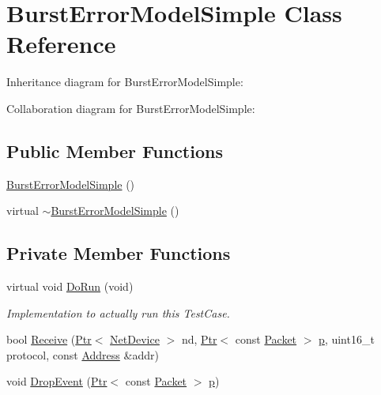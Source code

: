 \hypertarget{classBurstErrorModelSimple}{}\section{Burst\+Error\+Model\+Simple Class Reference}
\label{classBurstErrorModelSimple}


Inheritance diagram for Burst\+Error\+Model\+Simple\+:


Collaboration diagram for Burst\+Error\+Model\+Simple\+:
\subsection*{Public Member Functions}
\begin{DoxyCompactItemize}
\item 
\hyperlink{classBurstErrorModelSimple_ac223ceb1d31443236c2499829157fdf6}{Burst\+Error\+Model\+Simple} ()
\item 
virtual \hyperlink{classBurstErrorModelSimple_afc5f6a826bfa6bf8c0f58dd8e2b8906c}{$\sim$\+Burst\+Error\+Model\+Simple} ()
\end{DoxyCompactItemize}
\subsection*{Private Member Functions}
\begin{DoxyCompactItemize}
\item 
virtual void \hyperlink{classBurstErrorModelSimple_a9db92cbfd5b55bd457a776aaf418de37}{Do\+Run} (void)
\begin{DoxyCompactList}\small\item\em Implementation to actually run this Test\+Case. \end{DoxyCompactList}\item 
bool \hyperlink{classBurstErrorModelSimple_a309f11897a4c3c6d45966760cd3b4ed2}{Receive} (\hyperlink{classns3_1_1Ptr}{Ptr}$<$ \hyperlink{classns3_1_1NetDevice}{Net\+Device} $>$ nd, \hyperlink{classns3_1_1Ptr}{Ptr}$<$ const \hyperlink{classns3_1_1Packet}{Packet} $>$ \hyperlink{lte__link__budget__x2__handover__measures_8m_ac9de518908a968428863f829398a4e62}{p}, uint16\+\_\+t protocol, const \hyperlink{classns3_1_1Address}{Address} \&addr)
\item 
void \hyperlink{classBurstErrorModelSimple_a9c52c5097ecffd47e4537e6e41fd748c}{Drop\+Event} (\hyperlink{classns3_1_1Ptr}{Ptr}$<$ const \hyperlink{classns3_1_1Packet}{Packet} $>$ \hyperlink{lte__link__budget__x2__handover__measures_8m_ac9de518908a968428863f829398a4e62}{p})
\end{DoxyCompactItemize}
